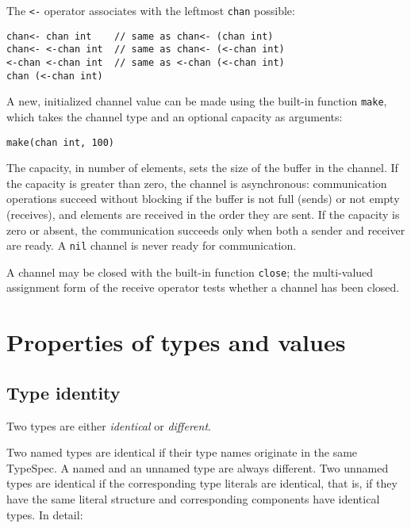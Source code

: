 The \texttt{\textless{}-} operator associates with the leftmost
\texttt{chan} possible:

\begin{Verbatim}[frame=single]
chan<- chan int    // same as chan<- (chan int)
chan<- <-chan int  // same as chan<- (<-chan int)
<-chan <-chan int  // same as <-chan (<-chan int)
chan (<-chan int)
\end{Verbatim}

A new, initialized channel value can be made using the built-in function
\texttt{make}, which
takes the channel type and an optional capacity as arguments:

\begin{Verbatim}[frame=single]
make(chan int, 100)
\end{Verbatim}

The capacity, in number of elements, sets the size of the buffer in the
channel. If the capacity is greater than zero, the channel is
asynchronous: communication operations succeed without blocking if the
buffer is not full (sends) or not empty (receives), and elements are
received in the order they are sent. If the capacity is zero or absent,
the communication succeeds only when both a sender and receiver are
ready. A \texttt{nil} channel is never ready for communication.

A channel may be closed with the built-in function
\texttt{close}; the multi-valued assignment form of
the receive operator tests whether a
channel has been closed.

\section*{Properties of types and values}

\subsection*{Type identity}

Two types are either \emph{identical} or \emph{different}.

Two named types are identical if their type names originate in the same
TypeSpec. A named and an unnamed type are
always different. Two unnamed types are identical if the corresponding
type literals are identical, that is, if they have the same literal
structure and corresponding components have identical types. In detail:

